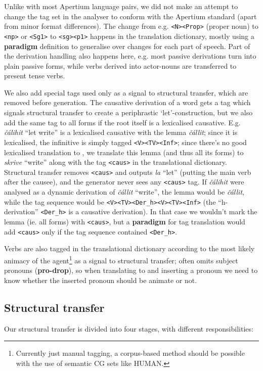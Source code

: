 \documentclass{book}
\begin{document}
Unlike with most Apertium language pairs, we did not make an attempt
to change the tag set in the analyser to conform with the Apertium
standard (apart from minor format differences). The change from e.g.
\texttt{<N><Prop>} (proper noun) to \texttt{<np>} or \texttt{<Sg1>} to
\texttt{<sg><p1>} happens in the translation dictionary, mostly using a
\textbf{paradigm} definition to generalise over changes for each part
of speech. Part of the derivation handling also happens here, e.g. 
most passive derivations turn into plain passive forms, while verbs
derived into actor-nouns are transferred to present tense verbs.

We also add special tags used only as a signal to structural transfer,
which are removed before generation. The causative derivation of a
word gets a tag which signals structural transfer to create a
periphrastic `let'-construction, but we also add the same tag to all
forms if the root itself is a lexicalised causative. E.g.
\textit{čálihit} ``let write'' is a lexicalised causative with the
lemma \textit{čállit}; since it is lexicalised, the infinitive is
simply tagged \texttt{<V><TV><Inf>}; since there's no good lexicalised
translation to \nob{}, we translate this lemma (and thus all its
forms) to \textit{skrive} ``write'' along with the tag \texttt{<caus>}
in the translational dictionary. Structural transfer removes
\texttt{<caus>} and outputs \textit{la} ``let'' (putting the main verb
after the causee), and the \nob{} generator never sees any
\texttt{<caus>} tag. If \textit{čálihit} were analysed as a dynamic
derivation of \textit{čállit} ``write'', the lemma would be
\textit{čállit}, while the tag sequence would be
\texttt{<V><TV><Der\_h><V><TV><Inf>} (the ``h-derivation''
\texttt{<Der\_h>} is a causative derivation). In that case we wouldn't
mark the lemma (ie. all forms) with \texttt{<caus>}, but a
\textbf{paradigm} for tag translation would add \texttt{<caus>} only
if the tag sequence contained \texttt{<Der\_h>}.

Verbs are also tagged in the translational dictionary according to the
most likely animacy of the agent\footnote{Currently just manual
  tagging, a corpus-based method should be possible with the use of
  semantic CG sets like HUMAN.} as a signal to structural transfer;
\sme{} often omits subject pronouns (\textbf{pro-drop}), so when
translating to \nob{} and inserting a pronoun we need to know whether
the inserted pronoun should be animate or not.

\subsection{Structural transfer}
\label{sec:structural-transfer}
Our structural transfer is divided into four stages, with different
responsibilities:
\end{document}
